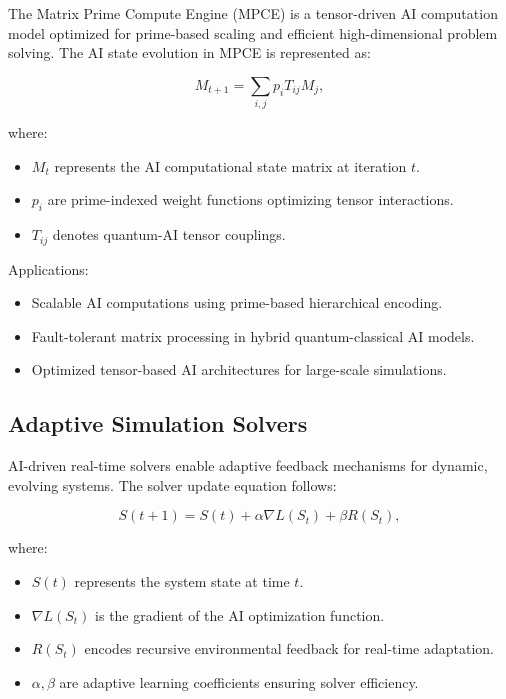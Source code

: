 \documentclass{article}
\theoremstyle{plain}
\begin{document}
\begin{itemize}
\begin{itemize}
The Matrix Prime Compute Engine (MPCE) is a tensor-driven AI computation model optimized for prime-based scaling and efficient high-dimensional problem solving. The AI state evolution in MPCE is represented as:

\begin{equation}
M_{t+1} = \sum_{i,j} p_i T_{ij} M_j,
\end{equation}

where:
\begin{itemize}
    \item $M_t$ represents the AI computational state matrix at iteration $t$.
    \item $p_i$ are prime-indexed weight functions optimizing tensor interactions.
    \item $T_{ij}$ denotes quantum-AI tensor couplings.
\end{itemize}

Applications:
\begin{itemize}
    \item Scalable AI computations using prime-based hierarchical encoding.
    \item Fault-tolerant matrix processing in hybrid quantum-classical AI models.
    \item Optimized tensor-based AI architectures for large-scale simulations.
\end{itemize}

\subsection{Adaptive Simulation Solvers}

AI-driven real-time solvers enable adaptive feedback mechanisms for dynamic, evolving systems. The solver update equation follows:

\begin{equation}
S(t+1) = S(t) + \alpha \nabla L(S_t) + \beta R(S_t),
\end{equation}

where:
\begin{itemize}
    \item $S(t)$ represents the system state at time $t$.
    \item $\nabla L(S_t)$ is the gradient of the AI optimization function.
    \item $R(S_t)$ encodes recursive environmental feedback for real-time adaptation.
    \item $\alpha, \beta$ are adaptive learning coefficients ensuring solver efficiency.
\end{itemize}


\end{itemize}
\end{itemize}
\end{document}
